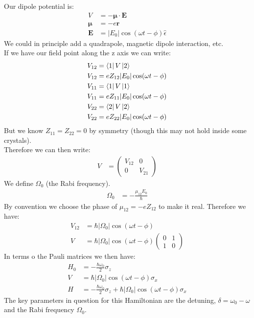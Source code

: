 Our dipole potential is:
\begin{align*}
	V &= -\bm{\mu}\cdot\bm{E} \\
	\bm{\mu} &= -e\bm{r} \\
	\bm{E} &= |E_0| \cos(\omega t-\phi)\hat{\epsilon}
\end{align*}
We could in principle add a quadrapole, magnetic dipole interaction, etc.\\
If we have our field point along the z axis we can write:
\begin{align*}
	V_{12} &= \bra{1} V\ket{2} \\
	V_{12} &= e Z_{12} |E_0| \cos(\omega t -\phi) \\
	V_{11} &= \bra{1} V\ket{1} \\
	V_{11} &= e Z_{11} |E_0| \cos(\omega t -\phi) \\
	V_{22} &= \bra{2} V\ket{2} \\
	V_{22} &= e Z_{22} |E_0| \cos(\omega t -\phi)
\end{align*}
But we know $Z_{11} = Z_{22} = 0$ by symmetry (though this may not hold inside some crystals). \\
Therefore we can then write:
\begin{align*}
	V &= \begin{pmatrix} V_{12} & 0 \\ 0 & V_{21} \end{pmatrix}
\end{align*}
We define $\Omega_0$ (the Rabi frequency).
\begin{align*}
	\Omega_0 &= -\frac{\mu_{12} E_0}{\hbar}
\end{align*}
By convention we choose the phase of $\mu_{12} = -e Z_{12}$ to make it real. Therefore we have:
\begin{align*}
	V_{12} &= \hbar |\Omega_0| \cos (\omega t -\phi) \\
	V &= \hbar |\Omega_0| \cos (\omega t - \phi)\begin{pmatrix}
		0 & 1 \\
		1 & 0
      \end{pmatrix}
\end{align*}
In terms o the Pauli matrices we then have:
\begin{align*}
	H_0 &= -\frac{\hbar\omega_0}{2} \sigma_z \\
	V &= \hbar |\Omega_0|\cos(\omega t - \phi) \sigma_x \\
	H &= -\frac{\hbar\omega_0}{2} \sigma_z + \hbar |\Omega_0|\cos(\omega t - \phi) \sigma_x
\end{align*}
The key parameters in question for this Hamiltonian are the detuning, $\delta=\omega_0-\omega$ and the Rabi frequency $\Omega_0$. \\
